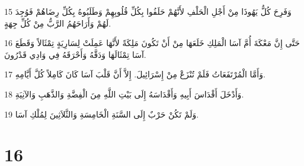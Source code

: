 \par 15 وَفَرِحَ كُلُّ يَهُوذَا مِنْ أَجْلِ الْحَلْفِ لأَنَّهُمْ حَلَفُوا بِكُلِّ قُلُوبِهِمْ وَطَلَبُوهُ بِكُلِّ رِضَاهُمْ فَوُجِدَ لَهُمْ وَأَرَاحَهُمُ الرَّبُّ مِنْ كُلِّ جِهَةٍ.
\par 16 حَتَّى إِنَّ مَعْكَةَ أُمَّ آسَا الْمَلِكِ خَلَعَهَا مِنْ أَنْ تَكُونَ مَلِكَةً لأَنَّهَا عَمِلَتْ لِسَارِيَةٍ تِمْثَالاً وَقَطَعَ آسَا تِمْثَالَهَا وَدَقَّهُ وَأَحْرَقَهُ فِي وَادِي قَدْرُونَ.
\par 17 وَأَمَّا الْمُرْتَفَعَاتُ فَلَمْ تُنْزَعْ مِنْ إِسْرَائِيلَ. إِلاَّ أَنَّ قَلْبَ آسَا كَانَ كَامِلاً كُلَّ أَيَّامِهِ.
\par 18 وَأَدْخَلَ أَقْدَاسَ أَبِيهِ وَأَقْدَاسَهُ إِلَى بَيْتِ اللَّهِ مِنَ الْفِضَّةِ وَالذَّهَبِ وَالآنِيَةِ.
\par 19 وَلَمْ تَكُنْ حَرْبٌ إِلَى السَّنَةِ الْخَامِسَةِ وَالثَّلاَثِينَ لِمُلْكِ آسَا.

\chapter{16}

